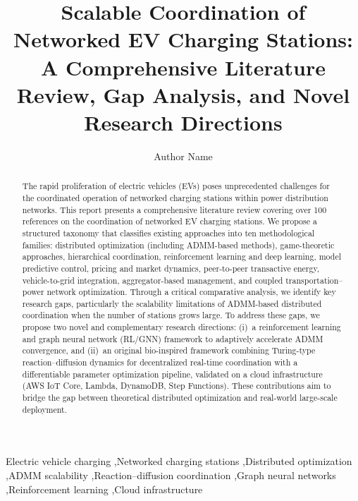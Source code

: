 \documentclass[review]{elsarticle}
\begin{document}
\begin{frontmatter}

\title{Scalable Coordination of Networked EV Charging Stations: \\
A Comprehensive Literature Review, Gap Analysis, and Novel Research Directions}

\author{Author Name}

\address{Department of Electrical Engineering, University Name, Country}

\begin{abstract}
The rapid proliferation of electric vehicles (EVs) poses unprecedented challenges for the coordinated operation of networked charging stations within power distribution networks. This report presents a comprehensive literature review covering over 100 references on the coordination of networked EV charging stations. We propose a structured taxonomy that classifies existing approaches into ten methodological families: distributed optimization (including ADMM-based methods), game-theoretic approaches, hierarchical coordination, reinforcement learning and deep learning, model predictive control, pricing and market dynamics, peer-to-peer transactive energy, vehicle-to-grid integration, aggregator-based management, and coupled transportation--power network optimization. Through a critical comparative analysis, we identify key research gaps, particularly the scalability limitations of ADMM-based distributed coordination when the number of stations grows large. To address these gaps, we propose two novel and complementary research directions: (i)~a reinforcement learning and graph neural network (RL/GNN) framework to adaptively accelerate ADMM convergence, and (ii)~an original bio-inspired framework combining Turing-type reaction--diffusion dynamics for decentralized real-time coordination with a differentiable parameter optimization pipeline, validated on a cloud infrastructure (AWS IoT Core, Lambda, DynamoDB, Step Functions). These contributions aim to bridge the gap between theoretical distributed optimization and real-world large-scale deployment.
\end{abstract}

\begin{keyword}
Electric vehicle charging \sep Networked charging stations \sep Distributed optimization \sep ADMM scalability \sep Reaction--diffusion coordination \sep Graph neural networks \sep Reinforcement learning \sep Cloud infrastructure
\end{keyword}

\end{frontmatter}
\end{document}
